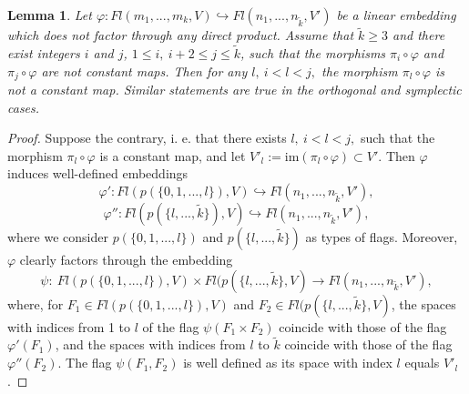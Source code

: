 \documentclass[12pt]{amsart}
\renewcommand{\phi}{\varphi}
\newtheorem{lemma}[theorem]{Lemma}
\theoremstyle{definition}
\begin{document}
\begin{lemma}\label{not extend}
Let $\phi:Fl(m_1,...,m_k,V)\hookrightarrow Fl(n_1,...,
n_{\tilde{k}},V')$ be a linear embedding which does not 
factor through any direct product. Assume that $\tilde{k}\ge
3$ and there exist integers $i$ and $j$, $1\le i,\ i+2\le 
j\le\tilde{k}$, such that the morphisms $\pi_i\circ\phi$ and 
$\pi_j\circ\phi$ are not constant maps. Then for any $l,\ 
i<l<j,$ the morphism $\pi_l\circ\phi$ is not a constant map. 
Similar statements are true in the orthogonal and symplectic 
cases.
\end{lemma}
\begin{proof}
Suppose the contrary, i. e. that there exists $l,\ i<l<j,$ 
such that the morphism $\pi_l\circ\phi$ is a constant map, and 
let $V'_l:=\mathrm{im}(\pi_l\circ\phi)\subset V'$. Then $\phi$ 
induces well-defined embeddings
$$
\phi': Fl(p(\{0,1,...,l\}),V)\hookrightarrow 
Fl(n_1,...,n_{\tilde{k}},V'),
$$
$$
\phi'': Fl(p(\{l,...,\tilde{k}\}),V)\hookrightarrow 
Fl(n_1,...,n_{\tilde{k}},V'),
$$
where we consider $p(\{0,1,...,l\})$ and $p(\{l,...,\tilde{k}\}
)$ as types of flags. Moreover, $\phi$ clearly factors through 
the embedding
$$
\psi:\ Fl(p(\{0,1,...,l\}),V)\times Fl(p(\{l,...,\tilde{k}\},V)
\to Fl(n_1,...,n_{\tilde{k}},V'),
$$
where, for $F_1\in Fl(p(\{0,1,...,l\}),V)$ and $F_2\in Fl(p(
\{l,...,\tilde{k}\},V)$, the spaces with indices from 1 to 
$l$ of the flag $\psi(F_1\times F_2)$ coincide with those of 
the flag $\phi'(F_1)$, and the spaces with indices from $l$ 
to $\tilde{k}$ coincide with those of the flag $\phi''(F_2)$. 
The flag $\psi(F_1,F_2)$ is well defined as its space with 
index $l$ equals $V'_l$.
\end{proof}
\end{document}
